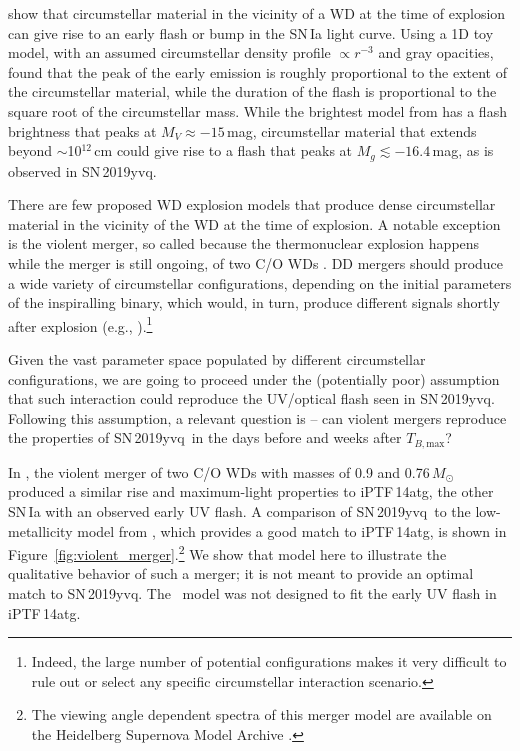 \documentclass[twocolumn]{aastex63}
\newcommand{\tbmax}{$T_{B,\mathrm{max}}$}
\newcommand{\sn}{SN\,2019yvq}
\begin{document}
\citet{Piro16} show that circumstellar material in the vicinity of a WD at the
time of explosion can give rise to an early flash or bump in the SN\,Ia light
curve. Using a 1D toy model, with an assumed circumstellar density profile
$\propto r^{-3}$ and gray opacities, \citet{Piro16} found that the peak of the
early emission is roughly proportional to the extent of the circumstellar
material, while the duration of the flash is proportional to the square root
of the circumstellar mass. While the brightest model from \citet{Piro16} has a
flash brightness that peaks at $M_V \approx -15$\,mag, circumstellar material
that extends beyond $\sim$10$^{12}$\,cm could give rise to a flash that peaks
at $M_g \lesssim -16.4$\,mag, as is observed in \sn.

There are few proposed WD explosion models that produce dense circumstellar
material in the vicinity of the WD at the time of explosion. A notable
exception is the violent merger, so called because the thermonuclear explosion
happens while the merger is still ongoing, of two C/O WDs
\citep{Pakmor10,Pakmor11,Pakmor12}. DD mergers should produce a wide variety
of circumstellar configurations, depending on the initial parameters of the
inspiralling binary, which would, in turn, produce different signals shortly
after explosion (e.g., \citealt{Raskin13,Levanon19}).\footnote{Indeed, the
large number of potential configurations makes it very difficult to rule out
or select any specific circumstellar interaction scenario.}

Given the vast parameter space populated by different circumstellar
configurations, we are going to proceed under the (potentially poor)
assumption that such interaction could reproduce the UV/optical flash seen in
\sn. Following this assumption, a relevant question is -- can violent mergers
reproduce the properties of \sn\ in the days before and weeks after \tbmax?

In \citet{Kromer16}, the violent merger of two C/O WDs with masses of 0.9 and
0.76\,$M_\odot$ produced a similar rise and maximum-light properties to
iPTF\,14atg, the other SN\,Ia with an observed early UV flash. A comparison of
\sn\ to the low-metallicity model from \citet{Kromer16}, which provides a good
match to iPTF\,14atg, is shown in
Figure~\ref{fig:violent_merger}.\footnote{The viewing angle dependent spectra
of this merger model are available on the Heidelberg Supernova Model Archive
\citep{Kromer17}.} We show that model here to illustrate the qualitative
behavior of such a merger; it is not meant to provide an optimal match to \sn.
The \citeauthor{Kromer16}~model was not designed to fit the early UV flash in
iPTF\,14atg.
\end{document}
